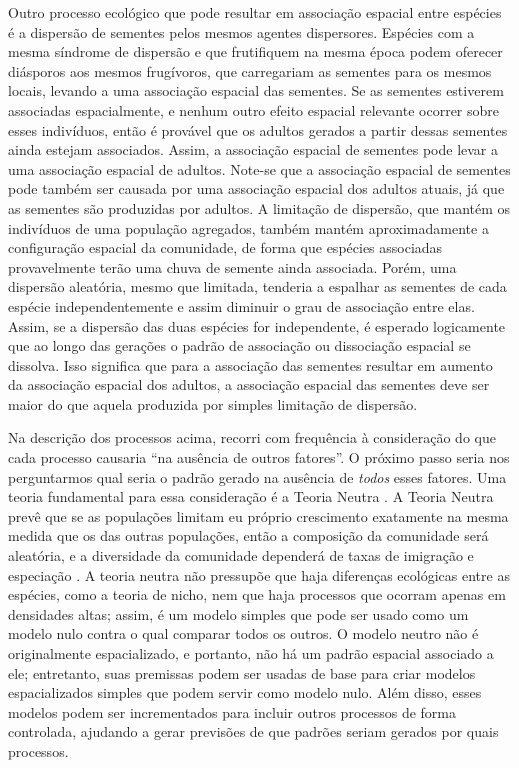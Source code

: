 \documentclass[twoside,12pt,a4paper]{report}
\begin{document}
Outro processo ecológico que pode resultar em associação espacial entre espécies é a
dispersão de sementes pelos mesmos agentes dispersores. Espécies com a mesma síndrome de
dispersão e que frutifiquem na mesma época podem oferecer diásporos aos mesmos frugívoros, que carregariam as
sementes para os mesmos locais, levando a uma associação espacial das sementes. Se as
sementes estiverem associadas espacialmente, e nenhum outro efeito espacial relevante ocorrer
sobre esses indivíduos, então é provável que os adultos gerados a partir dessas sementes ainda estejam
associados. Assim, a associação espacial de sementes pode levar a uma associação espacial de
adultos. Note-se que a associação espacial de sementes pode também ser causada por uma
associação espacial dos adultos atuais, já que as sementes são produzidas por adultos. A
limitação de dispersão, que mantém os indivíduos de uma população agregados, também mantém
aproximadamente a configuração espacial da comunidade, de forma que espécies associadas
provavelmente terão uma chuva de semente ainda associada. Porém, uma dispersão aleatória,
mesmo que limitada,
tenderia a espalhar as sementes de cada espécie independentemente e assim diminuir o grau de
associação entre elas. Assim, se a dispersão das duas espécies for independente, é esperado
logicamente que ao longo das
gerações o padrão de associação ou dissociação espacial se dissolva. Isso significa que para
a associação das sementes resultar em aumento da associação espacial dos adultos, a
associação espacial das sementes deve ser maior do que aquela produzida por simples limitação
de dispersão.

Na descrição dos processos acima, recorri com frequência à consideração do que cada processo
causaria ``na ausência de outros fatores''. O próximo passo seria nos perguntarmos qual seria
o padrão gerado na ausência de {\em todos} esses fatores. Uma teoria fundamental para essa
consideração é a Teoria Neutra \citep{Hubbell1979}.
A Teoria Neutra prevê que se as populações limitam eu
próprio crescimento exatamente na mesma medida que os das outras populações, então a
composição da comunidade será aleatória, e a diversidade da comunidade dependerá de taxas de
imigração e especiação \citep{Hubbell2001}. A teoria neutra não pressupõe que haja diferenças ecológicas entre
as espécies, como a teoria de nicho, nem que haja processos que ocorram apenas em densidades
altas; assim, é um modelo simples que pode ser usado como um modelo nulo contra o qual comparar
todos os outros. O modelo neutro não é originalmente espacializado, e portanto, não há
um padrão espacial associado a ele; entretanto, suas premissas podem ser usadas de base para
criar modelos espacializados simples que podem servir como modelo nulo. Além disso, esses
modelos podem ser incrementados para incluir outros processos de forma controlada, ajudando a
gerar previsões de que padrões seriam gerados por quais processos.
\end{document}
